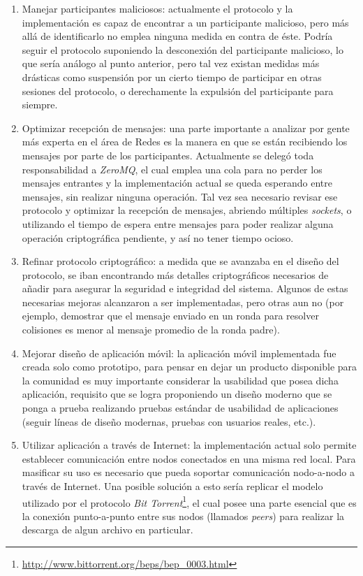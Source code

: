 \begin{enumerate}
    \item Manejar participantes maliciosos: actualmente el protocolo y la implementación 
    es capaz de encontrar a un participante malicioso, pero más allá de identificarlo 
    no emplea ninguna medida en contra de éste. Podría seguir el protocolo suponiendo 
    la desconexión del participante malicioso, lo que sería análogo al punto anterior, 
    pero tal vez existan medidas más drásticas como suspensión por un cierto tiempo 
    de participar en otras sesiones del protocolo, o derechamente la expulsión del 
    participante para siempre. 
    
    \item Optimizar recepción de mensajes: una parte importante a analizar por gente 
    más experta en el área de Redes es la manera en que se están recibiendo los 
    mensajes por parte de los participantes. Actualmente se delegó toda responsabilidad 
    a \emph{ZeroMQ}, el cual emplea una cola para no perder los mensajes entrantes 
    y la implementación actual se queda esperando entre mensajes, sin realizar 
    ninguna operación. Tal vez sea necesario revisar ese protocolo y optimizar la 
    recepción de mensajes, abriendo múltiples \emph{sockets}, o utilizando el tiempo 
    de espera entre mensajes para poder realizar alguna operación criptográfica 
    pendiente, y así no tener tiempo ocioso.
    
    \item Refinar protocolo criptográfico: a medida que se avanzaba en el diseño del 
    protocolo, se iban encontrando más detalles criptográficos necesarios de añadir 
    para asegurar la seguridad e integridad del sistema. Algunos de estas necesarias 
    mejoras alcanzaron a ser implementadas, pero otras aun no (por ejemplo, demostrar 
    que el mensaje enviado en un ronda para resolver colisiones es menor al mensaje 
    promedio de la ronda padre).
    
    \item Mejorar diseño de aplicación móvil: la aplicación móvil implementada fue 
    creada solo como prototipo, para pensar en dejar un producto disponible para la 
    comunidad es muy importante considerar la usabilidad que posea dicha aplicación, 
    requisito que se logra proponiendo un diseño moderno que se ponga a prueba 
    realizando pruebas estándar de usabilidad de aplicaciones (seguir líneas de diseño 
    modernas, pruebas con usuarios reales, etc.).
    
    \item Utilizar aplicación a través de Internet: la implementación actual solo 
    permite establecer comunicación entre nodos conectados en una misma red local. Para 
    masificar su uso es necesario que pueda soportar comunicación nodo-a-nodo a través 
    de Internet. Una posible solución a esto sería replicar el modelo utilizado por el 
    protocolo \emph{Bit Torrent}\footnote{\url{http://www.bittorrent.org/beps/bep_0003.html}}, el cual 
    posee una parte esencial que es la conexión punto-a-punto entre sus nodos (llamados 
    \emph{peers}) para realizar la descarga de algun archivo en particular.
    

\end{enumerate}
